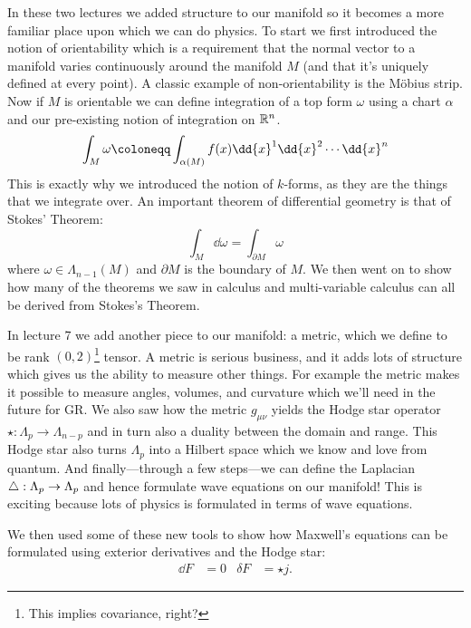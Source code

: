 \documentclass{homework}
\begin{document}
In these two lectures we added structure to our manifold so it becomes a more familiar place upon which we can do physics.
To start we first introduced the notion of orientability which is a requirement that the normal vector to a manifold varies continuously around the manifold $M$ (and that it's uniquely defined at every point).
A classic example of non-orientability is the M\"obius strip.
Now if $M$ is orientable we can define integration of a top form $\omega$ using a chart $\alpha$ and our pre-existing notion of integration on $\mathbb{R}^n$.
\begin{equation*}
	\int_M \omega \defeq \int_{\alpha(M)}f(x)\dd{x}^1\dd{x}^2\cdots\dd{x}^n
\end{equation*}
This is exactly why we introduced the notion of $k$-forms, as they are the things that we integrate over.
An important theorem of differential geometry is that of Stokes' Theorem:
\begin{equation*}
	\int_M\dd{\omega} = \int_{\partial M}\omega
\end{equation*}
where $\omega\in\Lambda_{n-1}(M)$ and $\partial M$ is the boundary of $M$.
We then went on to show how many of the theorems we saw in calculus and multi-variable calculus can all be derived from Stokes's Theorem.

In lecture 7 we add another piece to our manifold: a metric, which we define to be rank $(0, 2)$\footnote{This implies covariance, right?} tensor.
A metric is serious business, and it adds lots of structure which gives us the ability to measure other things.
For example the metric makes it possible to measure angles, volumes, and curvature which we'll need in the future for GR.
We also saw how the metric $g_{\mu\nu}$ yields the Hodge star operator $\star: \Lambda_p \to \Lambda_{n - p}$ and in turn also a duality between the domain and range.
This Hodge star also turns $\Lambda_p$ into a Hilbert space which we know and love from quantum.
And finally---through a few steps---we can define the Laplacian $\triangle: \Lambda_p \to \Lambda_p$ and hence formulate wave equations on our manifold!
This is exciting because lots of physics is formulated in terms of wave equations.

We then used some of these new tools to show how Maxwell's equations can be formulated using exterior derivatives and the Hodge star:
\begin{align*}
	\dd{F} & = 0 & \delta F & = \star j.
\end{align*}
\end{document}

